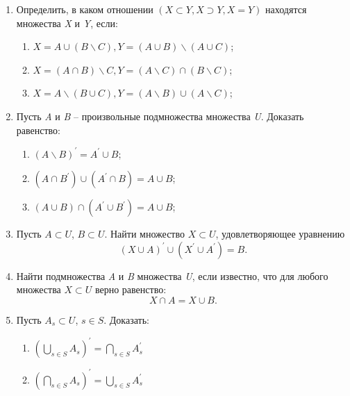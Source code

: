 \documentclass{article}
\begin{document}
\begin{enumerate}
        \item Определить, в каком отношении $(X \subset Y, X \supset Y, X = Y)$  находятся множества \textit{X} и \textit{Y}, если:
        \begin{enumerate}
            \item $X = A \cup (B \backslash C), Y = (A \cup B) \backslash (A \cup C)$;
            \item $X = (A \cap B) \backslash C, Y = (A \backslash C) \cap (B \backslash C)$;
            \item $X = A \backslash (B \cup C), Y = (A \backslash B) \cup (A \backslash C)$;
        \end{enumerate}

        \item Пусть \textit{A} и \textit{B} -- произвольные подмножества множества \textit{U}. Доказать равенство:
        \begin{enumerate}
            \item $(A \backslash B)^\prime = A^\prime \cup B$;
            \item $(A \cap B^\prime) \cup (A^\prime \cap B) = A \cup B$;
            \item $(A \cup B) \cap (A^\prime \cup B^\prime) = A \cup B$;
        \end{enumerate}

        \item Пусть $A \subset U$, $B \subset U$. Найти множество $X \subset U$, удовлетворяющее уравнению
        \begin{equation*}
        (X \cup A)^\prime \cup (X^\prime \cup A^\prime) = B.
        \end{equation*}

        \item Найти подмножества \textit{A} и \textit{B} множества \textit{U}, если известно, что для любого множества $X \subset U$ верно равенство:
        \begin{equation*}
            X \cap A = X \cup B.
        \end{equation*}

        \item Пусть $A_s \subset U$, $s \in S$. Доказать:
        \begin{enumerate}
            \item $(\bigcup\limits_{s \in S} A_s)^\prime = \bigcap\limits_{s \in S} A_s^\prime$
            \item $(\bigcap\limits_{s \in S} A_s)^\prime = \bigcup\limits_{s \in S} A_s^\prime$
        \end{enumerate}

    \end{enumerate}
\end{document}
